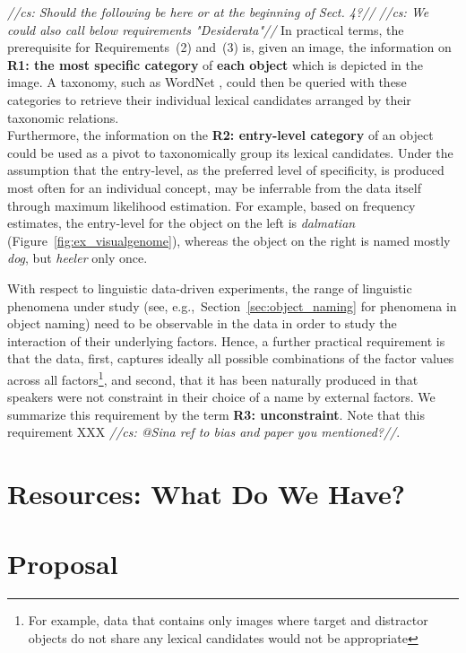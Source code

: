 \documentclass[runningheads]{llncs}
\newcommand{\cs}[1]{\textcolor{PineGreen}{\emph{//cs: #1//}}}
\newcommand{\refexp}[1]{\textsl{#1}}
\begin{document}
\cs{Should the following be here or at the beginning of Sect. 4?}
\cs{We could also call below requirements "Desiderata"}
In practical terms, the prerequisite for Requirements~(2) and~(3) is, given an image, the information on \textbf{R1: the most specific category} of \textbf{each object} which is depicted in the image. 
A taxonomy, such as WordNet \cite{fellbaum1998wordnet}, could then be queried with these categories to retrieve their individual lexical candidates arranged by their taxonomic relations. \\
Furthermore, the information on the \textbf{R2: entry-level category} of an object could be used as a pivot to taxonomically group its lexical candidates.  
Under the assumption that the entry-level, as the preferred level of specificity, is produced most often for an individual concept, may be inferrable from the data itself through maximum likelihood estimation. 
For example, based on frequency estimates, the entry-level for the object on the left is \refexp{dalmatian} (Figure~\ref{fig:ex_visualgenome}), whereas the object on the right is named mostly \refexp{dog}, but \refexp{heeler} only once. 

With respect to linguistic data-driven experiments, the range of linguistic phenomena under study (see, e.g.,~Section~\ref{sec:object_naming} for phenomena in object naming) need to be observable in the data in order to study the interaction of their underlying factors. 
Hence, a further practical requirement is that the data, first, captures ideally all possible combinations of the factor values across all factors\footnote{For example, data that contains only images where target and distractor objects do not share any lexical candidates would not be appropriate}, and second, that it has been naturally produced in that speakers were not constraint in their choice of a name by external factors. 
We summarize this requirement by the term \textbf{R3: unconstraint}. 
Note that this requirement XXX \cs{@Sina ref to bias and paper you mentioned?}.



\section{Resources: What Do We Have?}
\label{sec:resources}



\section{Proposal}
%


\clearpage


\end{document}

